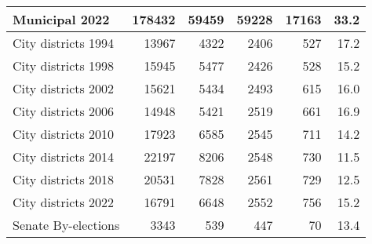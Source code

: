 \begin{tabular}{l|r|r|r|r|r}
\hline
Municipal 2022 & 178432 & 59459 & 59228 & 17163 & 33.2\\
\hline
City districts 1994 & 13967 & 4322 & 2406 & 527 & 17.2\\
\hline
City districts 1998 & 15945 & 5477 & 2426 & 528 & 15.2\\
\hline
City districts 2002 & 15621 & 5434 & 2493 & 615 & 16.0\\
\hline
City districts 2006 & 14948 & 5421 & 2519 & 661 & 16.9\\
\hline
City districts 2010 & 17923 & 6585 & 2545 & 711 & 14.2\\
\hline
City districts 2014 & 22197 & 8206 & 2548 & 730 & 11.5\\
\hline
City districts 2018 & 20531 & 7828 & 2561 & 729 & 12.5\\
\hline
City districts 2022 & 16791 & 6648 & 2552 & 756 & 15.2\\
\hline
Senate By-elections & 3343 & 539 & 447 & 70 & 13.4\\
\hline
\end{tabular}
